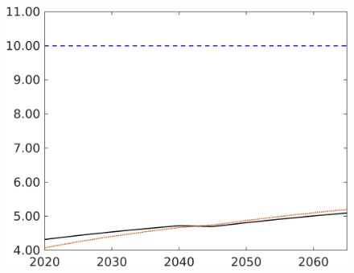 \begin{figure}[h!!]
\begin{minipage}[]{0.32\textwidth}
	\end{minipage}
	\begin{minipage}[]{0.32\textwidth}
		\includegraphics[width=1\textwidth]{../../codding_model/own_basedOnFried/optimalPol_190722_tidiedUp/figures/all_10Aout22/CompMod1_OPT_T_NoTaus_gAagg_regime3_spillover0_noskill0_sep1_xgrowth0_extern0_etaa0.79_lgd0.png}
	\end{minipage}
\end{figure}

 

